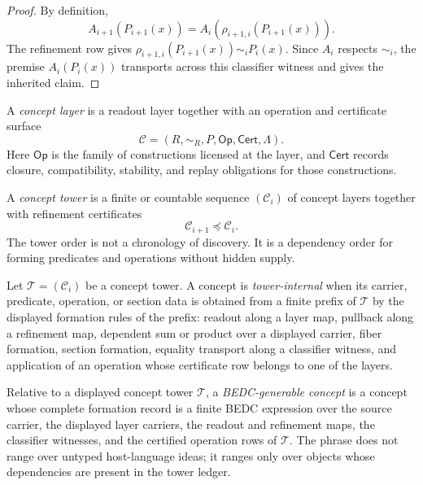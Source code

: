 \begin{proof}
By definition,
$$
A_{i+1}(P_{i+1}(x))
=
A_i(\rho_{i+1,i}(P_{i+1}(x))).
$$
The refinement row gives
$\rho_{i+1,i}(P_{i+1}(x))\sim_i P_i(x)$. Since $A_i$ respects
$\sim_i$, the premise $A_i(P_i(x))$ transports across this classifier
witness and gives the inherited claim.
\end{proof}


\begin{definition}
\label{def:layered-projection-concept-layer}
A \emph{concept layer} is a readout layer together with an operation and
certificate surface
$$
\mathcal C=(R,\sim_R,P,\mathsf{Op},\mathsf{Cert},\Lambda).
$$
Here $\mathsf{Op}$ is the family of constructions licensed at the layer,
and $\mathsf{Cert}$ records closure, compatibility, stability, and
replay obligations for those constructions.
\end{definition}

\begin{definition}
\label{def:layered-projection-concept-tower}
A \emph{concept tower} is a finite or countable sequence
$(\mathcal C_i)$ of concept layers together with refinement certificates
$$
\mathcal C_{i+1}\preceq\mathcal C_i.
$$
The tower order is not a chronology of discovery. It is a dependency
order for forming predicates and operations without hidden supply.
\end{definition}

\begin{definition}
\label{def:layered-projection-tower-internal-concept}
Let $\mathcal T=(\mathcal C_i)$ be a concept tower. A concept is
\emph{tower-internal} when its carrier, predicate, operation, or section
data is obtained from a finite prefix of $\mathcal T$ by the displayed
formation rules of the prefix: readout along a layer map, pullback along a
refinement map, dependent sum or product over a displayed carrier, fiber
formation, section formation, equality transport along a classifier
witness, and application of an operation whose certificate row belongs to
one of the layers.
\end{definition}

\begin{definition}
\label{def:layered-projection-bedc-generable-concept}
Relative to a displayed concept tower $\mathcal T$, a
\emph{BEDC-generable concept} is a concept whose complete formation
record is a finite BEDC expression over the source carrier, the displayed
layer carriers, the readout and refinement maps, the classifier
witnesses, and the certified operation rows of $\mathcal T$. The phrase
does not range over untyped host-language ideas; it ranges only over
objects whose dependencies are present in the tower ledger.
\end{definition}

